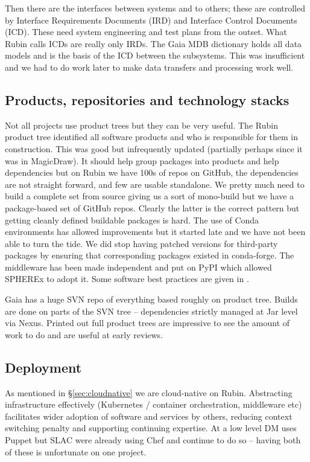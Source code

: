 \documentclass[11pt,twoside]{article}
\begin{document}
Then there are the interfaces between systems and to others; these are controlled by Interface Requirements Documents (IRD) and Interface Control Documents (ICD).
These need system engineering and test plans from the outset.
What Rubin calls ICDs are really only IRDs.
The Gaia MDB dictionary holds all data models \citep{2015ASPC..495...47H, 2011ASPC..442..351O} and is the basis of the ICD between the subsystems.
This was insufficient and we had to do work later to make data transfers and processing work well.

\subsection{Products, repositories and technology stacks}

Not all projects use product trees but they can be very useful.
The Rubin product tree identified all  software products  and who is responsible for them in construction.
This was good but infrequently updated (partially perhaps since it was in MagicDraw).
It should help group packages into products and help dependencies but
on Rubin we have 100s of repos on GitHub, the dependencies are not straight forward, and few are usable standalone.
We pretty much need to build a complete set from source giving us a sort of
 mono-build but we have a package-based set of GitHub repos.
Clearly the latter is the correct pattern but getting cleanly defined buildable packages is hard.
The use of Conda environments has allowed improvements but it started late and we have not been able to turn the tide.
We did stop having patched versions for third-party packages by ensuring that corresponding packages existed in conda-forge.
The middleware has  been made independent and put on PyPI which allowed SPHEREx to adopt it.
Some software best practices are given in \citet{2018SPIE10707E..09J}.

Gaia has a huge SVN repo of everything based roughly on product tree.  Builds are done on parts of the SVN tree -- dependencies strictly managed at Jar level via Nexus.
Printed out full product trees are impressive to see the amount of work to do and are useful at early reviews.

\subsection{Deployment}
As mentioned in \S\ref{sec:cloudnative} we are cloud-native on Rubin.
Abstracting infrastructure effectively (Kubernetes / container orchestration, middleware etc) facilitates wider adoption of software and services by others, reducing context switching penalty and supporting continuing expertise.
At a low level DM uses Puppet but SLAC were already using Chef and continue to do so -- having both of these is unfortunate on one project.
\end{document}
